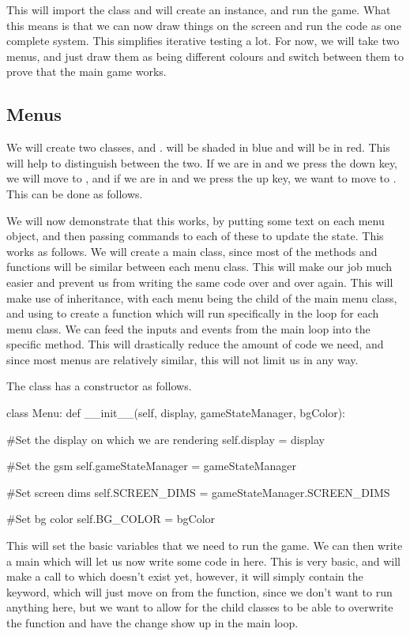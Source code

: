 This will import the  class and will create an instance, and run the game. What this means is that we can now draw things on the screen and run the code as one complete system. This simplifies iterative testing a lot. For now, we will take two menus, and just draw them as being different colours and switch between them to prove that the main game works.

\subsection{Menus}

\vs
We will create two classes,  and .  will be shaded in blue and  will be in red. This will help to distinguish between the two. If we are in  and we press the down key, we will move to , and if we are in  and we press the up key, we want to move to . This can be done as follows.

\vs
We will now demonstrate that this works, by putting some text on each menu object, and then passing commands to each of these to update the state. This works as follows. We will create a main  class, since most of the methods and functions will be similar between each menu class. This will make our job much easier and prevent us from writing the same code over and over again. This will make use of inheritance, with each menu being the child of the main menu class, and using  to create a function which will run specifically in the loop for each menu class. We can feed the inputs and events from the main loop into the specific method. This will drastically reduce the amount of code we need, and since most menus are relatively similar, this will not limit us in any way.


\vs
The  class has a constructor as follows.
\begin{mpy}
class Menu:
    def __init__(self, display, gameStateManager, bgColor):

        #Set the display on which we are rendering
        self.display = display
        
        #Set the gsm
        self.gameStateManager = gameStateManager

        #Set screen dims
        self.SCREEN_DIMS = gameStateManager.SCREEN_DIMS

        #Set bg color
        self.BG_COLOR = bgColor
\end{mpy}

This will set the basic variables that we need to run the game. We can then write a main  which will let us now write some code in here. This is very basic, and will make a call to  which doesn't exist yet, however, it will simply contain the  keyword, which will just move on from the function, since we don't want to run anything here, but we want to allow for the child classes to be able to overwrite the function and have the change show up in the main  loop.

